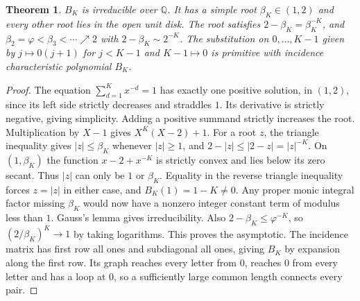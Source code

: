 \documentclass[11pt,reqno]{amsart}
\newtheorem{theorem}{Theorem}[section]
\theoremstyle{definition}
\theoremstyle{remark}
\numberwithin{equation}{section}
\newcommand{\Q}{\mathbb{Q}}
\begin{document}
\begin{theorem}\label{m9:pisot}
\(B_K\) is irreducible over \(\Q\). It has a simple root
\(\beta_K\in(1,2)\) and every other root lies in the open unit disk.
The root satisfies \(2-\beta_K=\beta_K^{-K}\), and
\(\beta_2=\varphi<\beta_3<\cdots\nearrow2\) with
\(2-\beta_K\sim2^{-K}\). The substitution on \(0,\ldots,K-1\)
given by \(j\mapsto0(j+1)\) for \(j<K-1\) and \(K-1\mapsto0\)
is primitive with incidence characteristic polynomial \(B_K\).
\end{theorem}
\begin{proof}
The equation \(\sum_{d=1}^K x^{-d}=1\) has exactly one positive
solution, in \((1,2)\), since its left side strictly decreases and
straddles \(1\). Its derivative is strictly negative, giving
simplicity. Adding a positive summand strictly increases the root.
Multiplication by \(X-1\) gives \(X^K(X-2)+1\). For a root \(z\),
the triangle inequality gives \(|z|\le\beta_K\) whenever \(|z|\ge1\),
and \(2-|z|\le |2-z|=|z|^{-K}\). On \((1,\beta_K)\) the function
\(x-2+x^{-K}\) is strictly convex and lies below its zero secant.
Thus \(|z|\) can only be \(1\) or \(\beta_K\).
Equality in the reverse triangle inequality forces \(z=|z|\)
in either case, and \(B_K(1)=1-K\ne0\). Any proper monic integral
factor missing \(\beta_K\) would now have a nonzero integer
constant term of modulus less than \(1\). Gauss's lemma gives
irreducibility. Also \(2-\beta_K\le\varphi^{-K}\), so
\((2/\beta_K)^K\to1\) by taking logarithms. This proves the
asymptotic. The incidence matrix has first row all ones and
subdiagonal all ones, giving \(B_K\) by expansion along the first
row. Its graph reaches every letter from \(0\), reaches \(0\) from
every letter and has a loop at \(0\), so a sufficiently large
common length connects every pair.
\end{proof}
\end{document}
